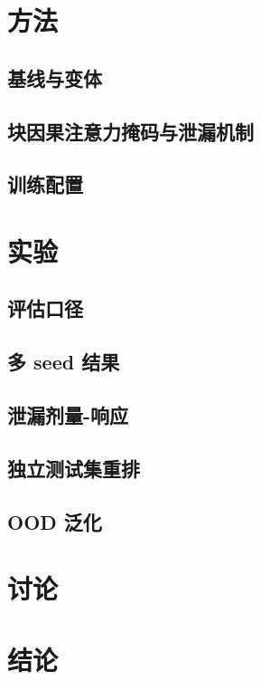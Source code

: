 \documentclass[10pt,a4paper]{article}
\begin{document}
\section{方法}
\subsection{基线与变体}
\subsection{块因果注意力掩码与泄漏机制}
\subsection{训练配置}

\section{实验}
\subsection{评估口径}
\subsection{多 seed 结果}
\subsection{泄漏剂量-响应}
\subsection{独立测试集重排}
\subsection{OOD 泛化}

\section{讨论}

\section{结论}



\end{document}
